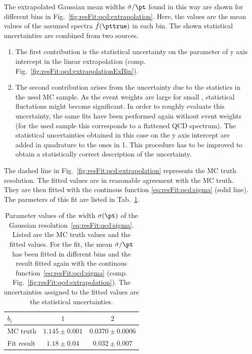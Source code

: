 \documentclass[a4paper]{cmspaper} %
\begin{document}
The extrapolated Gaussian mean widths $\bar{\sigma}/\pt$ found in this way are shown for different \pt bins in Fig.~\ref{fig:resFit:qcd:extrapolation}.
Here, the \pt values are the mean values of the assumed spectra $\tilde{f}(\pttrue)$ in each bin.
The shown statistical uncertainties are combined from two sources.
\begin{enumerate}
\item The first contribution is the statistical uncertainty on the parameter of y axis intercept in the linear extrapolation (comp. Fig.~\ref{fig:resFit:qcd:extrapolationExBin}).
\item The second contribution arises from the uncertainty due to the statistics in the used MC sample.
  As the event weights are large for small \pt, statistical fluctations might become significant.
  In order to roughly evaluate this uncertainty, the same fits have been performed again without event weights (for the used sample this corresponds to a flattened QCD spectrum).
  The statistical uncertainties obtained in this case on the y axis intercept are added in quadrature to the ones in 1.
  This procedure has to be improved to obtain a statistically correct description of the uncertainty.
\end{enumerate}

The dashed line in Fig.~\ref{fig:resFit:qcd:extrapolation} represents the MC truth resolution.
The fitted values are in reasonable agreement with the MC truth.
They are then fitted with the continous function \eqref{eq:resFit:qcd:sigma} (solid line).
The parmeters of this fit are listed in Tab.~\ref{tab:resFit:qcd:resolution}.

\begin{table}[ht]
  \centering
  \begin{tabular}[ht]{lcc}
    \hline \hline
    $b_{i}$ & $1$ & $2$ \\
    \hline
    MC truth    & $1.145 \pm 0.001$ & $0.0370 \pm 0.0006$ \\
    Fit result  & $1.18  \pm 0.04$  & $0.032  \pm 0.007$ \\
    \hline \hline
  \end{tabular}
  \caption{Parameter values of the width $\sigma(\pt)$ of the Gaussian resolution~\eqref{eq:resFit:qcd:sigma}.
    Listed are the MC truth values and the fitted values.
    For the fit, the mean $\bar{\sigma}/\pt$ has been fitted in different \pt bins and the result fitted again with the continous function~\eqref{eq:resFit:qcd:sigma} (comp. Fig.~\ref{fig:resFit:qcd:extrapolation}).
    The uncertainties assigned to the fitted values are the statistical uncertainties.}
  \label{tab:resFit:qcd:resolution}
\end{table}
\end{document}
